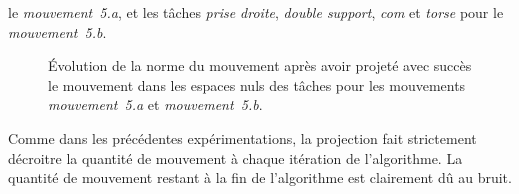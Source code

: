 le \emph{mouvement~5.a}, et les t\^aches \emph{prise droite}, \emph{double support}, \emph{com}
et \emph{torse} pour le \emph{mouvement~5.b}.
\begin{figure*}[t]
  \centering
  \subfigure[Mouvement 5.a]{
  \resizebox{.46\textwidth}{!} {
    
  }
  }
  \subfigure[Mouvement 5.b]{
  \resizebox{.46\textwidth}{!} {
    
  }
}
\caption[Évolution de la norme du mouvement.]{Évolution de la norme du mouvement après avoir projeté avec succès
le mouvement dans les espaces nuls des t\^aches pour les mouvements
\emph{mouvement~5.a} et \emph{mouvement~5.b}.}
\label{fig:exp6:PqdotNorms5}
\end{figure*}
Comme dans les précédentes expérimentations, la projection fait strictement décroitre
la quantité de mouvement à chaque itération de l'algorithme. La quantité de mouvement restant 
à la fin de l'algorithme est clairement dû au bruit.
\FloatBarrier

